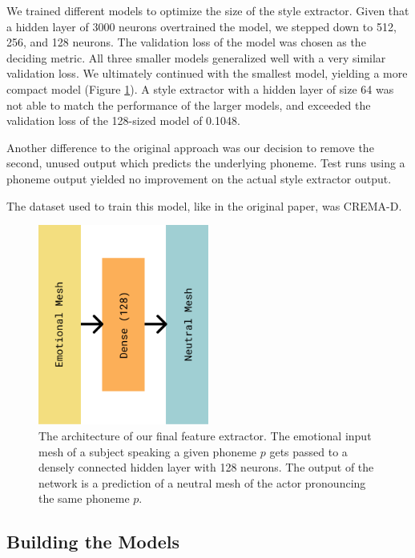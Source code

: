 We trained different models to optimize the size of the style extractor. Given that a hidden layer of 3000 neurons overtrained the model, we stepped down to 512, 256, and 128 neurons. The validation loss of the model was chosen as the deciding metric. 
All three smaller models generalized well with a very similar validation loss. We ultimately continued with the smallest model, yielding a more compact model (Figure \ref{fig:fextractor}). A style extractor with a hidden layer of size 64 was not able to match the performance of the larger models, and exceeded the validation loss of the 128-sized model of 0.1048.

Another difference to the original approach was our decision to remove the second, unused output which predicts the underlying phoneme. Test runs using a phoneme output yielded no improvement on the actual style extractor output.

The dataset used to train this model, like in the original paper, was CREMA-D.

\begin{figure}
    \centering
    \includegraphics[width=0.5\textwidth]{res/png_backup/styleex.png}
    \caption{The architecture of our final feature extractor. The emotional input mesh of a subject speaking a given phoneme $p$ gets passed to a densely connected hidden layer with 128 neurons. The output of the network is a prediction of a neutral mesh of the actor pronouncing the same phoneme $p$.}
    \label{fig:fextractor}
\end{figure}

\subsection{Building the Models}
\label{sec:building}


